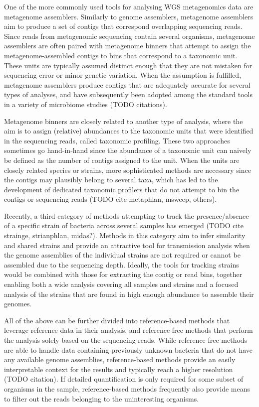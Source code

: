 \documentclass[officiallayout]{tktla}
\begin{document}
One of the more commonly used tools for analysing WGS metagenomics
data are metagenome assemblers. Similarly to genome assemblers,
metagenome assemblers aim to produce a set of contigs that correspond
overlapping sequencing reads. Since reads from metagenomic sequencing
contain several organisms, metagenome assemblers are often paired with
metagenome binners that attempt to assign the metagenome-assembled
contigs to bins that correspond to a taxonomic unit. These units are
typically assumed distinct enough that they are not mistaken for
sequencing error or minor genetic variation. When the assumption is
fulfilled, metagenome assemblers produce contigs that are adequately
accurate for several types of analyses, and have subsequently been
adopted among the standard tools in a variety of microbiome studies
(TODO citations).

Metagenome binners are closely related to another type of analysis,
where the aim is to assign (relative) abundances to the taxonomic
units that were identified in the sequencing reads, called taxonomic
profiling. These two approaches sometimes go hand-in-hand since the
abundance of a taxonomic unit can naively be defined as the number of
contigs assigned to the unit. When the units are closely related
species or strains, more sophisticated methods are necessary since the
contigs may plausibly belong to several taxa, which has led to the
development of dedicated taxonomic profilers that do not attempt to
bin the contigs or sequencing reads (TODO cite metaphlan, msweep,
others).

Recently, a third category of methods attempting to track the
presence/absence of a specific strain of bacteria across several
samples has emerged (TODO cite strainge, strianphlan, midas?). Methods
in this category aim to infer similarity and shared strains and
provide an attractive tool for transmission analysis when the genome
assemblies of the individual strains are not required or cannot be
assembled due to the sequencing depth. Ideally, the tools for tracking
strains would be combined with those for extracting the contig or read
bins, together enabling both a wide analysis covering all samples and
strains and a focused analysis of the strains that are found in high enough
abundance to assemble their genomes.

All of the above can be further divided into reference-based methods
that leverage reference data in their analysis, and reference-free
methods that perform the analysis solely based on the sequencing
reads. While reference-free methods are able to handle data containing
previously unknown bacteria that do not have any available genome
assemblies, reference-based methods provide an easily interpretable
context for the results and typically reach a higher resolution (TODO
citation). If detailed quantification is only required for some subset
of organisms in the sample, reference-based methods frequently also
provide means to filter out the reads belonging to the uninteresting
organisms.
\end{document}
